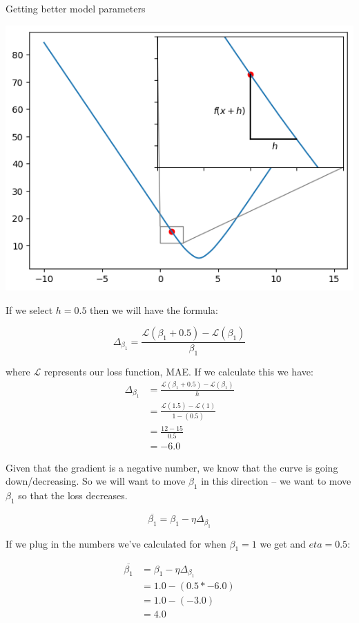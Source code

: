 \documentclass[10pt]{beamer}
\begin{document}
\begin{frame}[fragile,allowframebreaks,label=]{Getting better model parameters}
\begin{center}
\includegraphics[width=.9\linewidth]{images/small_step.png}
\end{center}

If we select \(h = 0.5\) then we will have the formula:

\[
\Delta_{\beta_1} = \frac{\mathcal{L}(\beta_1 + 0.5) - \mathcal{L}(\beta_1)}{\beta_1}
\]

where \(\mathcal{L}\) represents our loss function, MAE. If we calculate this we have:
\[\begin{aligned}
\Delta_{\beta_1} &= \frac{\mathcal{L}(\beta_1 + 0.5) - \mathcal{L}(\beta_1)}{h} \\
&= \frac{\mathcal{L}(1.5)- \mathcal{L}(1)}{1  - (0.5)} \\
&= \frac{12 - 15}{0.5} \\
&= -6.0
\end{aligned}\]

Given that the gradient is a negative number, we know that the curve is going
down/decreasing. So we will want to move \(\beta_1\) in this direction -- we want to move
\(\beta_1\) so that the loss decreases.

\[
\overline{\beta_1} = \beta_1 - \eta \Delta_{\beta_1}
\]

If we plug in the numbers we've calculated for when \(\beta_1 = 1\) we get and \(eta = 0.5\):

\[\begin{aligned}
\overline{\beta_1} &= \beta_1 - \eta \Delta_{\beta_1} \\
&= 1.0 - (0.5 * -6.0) \\
&= 1.0 - (-3.0) \\
&= 4.0
\end{aligned}\]


\end{frame}
\end{document}
